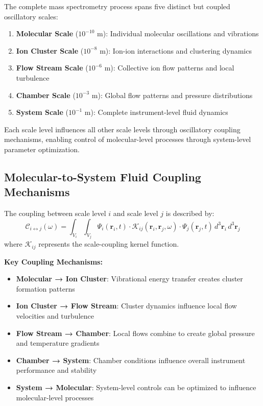 \begin{definition}
The complete mass spectrometry process spans five distinct but coupled oscillatory scales:
\begin{enumerate}
\item \textbf{Molecular Scale} ($10^{-10}$ m): Individual molecular oscillations and vibrations
\item \textbf{Ion Cluster Scale} ($10^{-8}$ m): Ion-ion interactions and clustering dynamics  
\item \textbf{Flow Stream Scale} ($10^{-6}$ m): Collective ion flow patterns and local turbulence
\item \textbf{Chamber Scale} ($10^{-3}$ m): Global flow patterns and pressure distributions
\item \textbf{System Scale} ($10^{-1}$ m): Complete instrument-level fluid dynamics
\end{enumerate}
\end{definition}

\begin{theorem}
Each scale level influences all other scale levels through oscillatory coupling mechanisms, enabling control of molecular-level processes through system-level parameter optimization.
\end{theorem}

\subsection{Molecular-to-System Fluid Coupling Mechanisms}

\begin{definition}
The coupling between scale level $i$ and scale level $j$ is described by:
$$\mathcal{C}_{i \leftrightarrow j}(\omega) = \int_{V_i} \int_{V_j} \Psi_i(\mathbf{r}_i, t) \cdot \mathcal{K}_{ij}(\mathbf{r}_i, \mathbf{r}_j, \omega) \cdot \Psi_j(\mathbf{r}_j, t) \, d^3\mathbf{r}_i \, d^3\mathbf{r}_j$$
where $\mathcal{K}_{ij}$ represents the scale-coupling kernel function.
\end{definition}

\textbf{Key Coupling Mechanisms:}
\begin{itemize}
\item \textbf{Molecular → Ion Cluster}: Vibrational energy transfer creates cluster formation patterns
\item \textbf{Ion Cluster → Flow Stream}: Cluster dynamics influence local flow velocities and turbulence
\item \textbf{Flow Stream → Chamber}: Local flows combine to create global pressure and temperature gradients
\item \textbf{Chamber → System}: Chamber conditions influence overall instrument performance and stability
\item \textbf{System → Molecular}: System-level controls can be optimized to influence molecular-level processes
\end{itemize}

